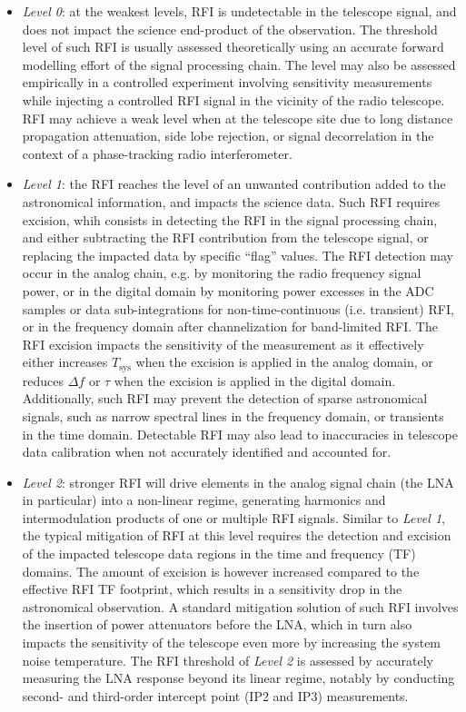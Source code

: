 \begin{itemize}

\item \emph{Level 0}: at the weakest levels, RFI is undetectable in the telescope signal, and does not impact the science end-product of the observation. The threshold level of such RFI is usually assessed theoretically using an accurate forward modelling effort of the signal processing chain. The level may also be assessed empirically in a controlled experiment involving sensitivity measurements while injecting a controlled RFI signal in the vicinity of the radio telescope. RFI may achieve a weak level when at the telescope site due to long distance propagation attenuation, side lobe rejection, or signal decorrelation in the context of a phase-tracking radio interferometer.

\item \emph{Level 1}: the RFI reaches the level of an unwanted contribution added to the astronomical information, and impacts the science data. Such RFI requires excision, whih consists in detecting the RFI in the signal processing chain, and either subtracting the RFI contribution from the telescope signal, or replacing the impacted data by specific ``flag'' values. The RFI detection may occur in the analog chain, e.g. by monitoring the radio frequency signal power, or in the digital domain by monitoring power excesses in the ADC samples or data sub-integrations for non-time-continuous (i.e. transient) RFI, or in the frequency domain after channelization for band-limited RFI. The RFI excision impacts the sensitivity of the measurement as it effectively either increases $T_{\text{sys}}$ when the excision is applied in the analog domain, or reduces $\Delta f$ or $\tau$ when the excision is applied in the digital domain. Additionally, such RFI may prevent the detection of sparse astronomical signals, such as narrow spectral lines in the frequency domain, or transients in the time domain. Detectable RFI may also lead to inaccuracies in telescope data calibration when not accurately identified and accounted for.

\item \emph{Level 2}: stronger RFI will drive elements in the analog signal chain (the LNA in particular) into a non-linear regime, generating harmonics and intermodulation products of one or multiple RFI signals. Similar to \emph{Level 1}, the typical mitigation of RFI at this level requires the detection and excision of the impacted telescope data regions in the time and frequency (TF) domains. The amount of excision is however increased compared to the effective RFI TF footprint, which results in a sensitivity drop in the astronomical observation. A standard mitigation solution of such RFI involves the insertion of power attenuators before the LNA, which in turn also impacts the sensitivity of the telescope even more by increasing the system noise temperature. The RFI threshold of \emph{Level 2} is assessed by accurately measuring the LNA response beyond its linear regime, notably by conducting second- and third-order intercept point (IP2 and IP3) measurements.


\end{itemize}
